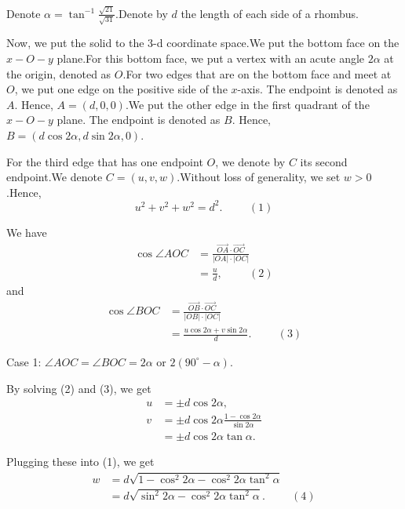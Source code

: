 \begin{enumerate}
{{Denote $\alpha = \tan^{-1} \frac{\sqrt{21}}{\sqrt{31}}$.Denote by $d$ the length of each side of a rhombus.

 Now, we put the solid to the 3-d coordinate space.We put the bottom face on the $x-O-y$ plane.For this bottom face, we put a vertex with an acute angle $2 \alpha$ at the origin, denoted as $O$.For two edges that are on the bottom face and meet at $O$, we put one edge on the positive side of the $x$-axis. The endpoint is denoted as $A$. Hence, $A = \left( d , 0 , 0 \right)$.We put the other edge in the first quadrant of the $x-O-y$ plane. The endpoint is denoted as $B$. Hence, $B = \left( d \cos 2 \alpha , d \sin 2 \alpha , 0 \right)$.

 For the third edge that has one endpoint $O$, we denote by $C$ its second endpoint.We denote $C = \left( u , v , w \right)$.Without loss of generality, we set $w > 0$.Hence,
 \[ u^2 + v^2 + w^2 = d^2 . \hspace{1cm} (1) \]

 We have
 \begin{align*} \cos \angle AOC & = \frac{\overrightarrow{OA} \cdot \overrightarrow{OC}}{|OA| \cdot |OC|} \\ & = \frac{u}{d} , \hspace{1cm} (2) \end{align*}
and
 \begin{align*} \cos \angle BOC & = \frac{\overrightarrow{OB} \cdot \overrightarrow{OC}}{|OB| \cdot |OC|} \\ & = \frac{u \cos 2 \alpha + v \sin 2 \alpha}{d} . \hspace{1cm} (3) \end{align*}


 Case 1: $\angle AOC = \angle BOC = 2 \alpha$ or $2 \left( 90^\circ - \alpha \right)$.

 By solving (2) and (3), we get
 \begin{align*} u & = \pm d \cos 2 \alpha , \\ v & = \pm d \cos 2 \alpha \frac{1 - \cos 2 \alpha}{\sin 2 \alpha} \\ & = \pm d \cos 2 \alpha \tan \alpha . \end{align*}


 Plugging these into (1), we get
 \begin{align*} w & = d \sqrt{1 - \cos^2 2 \alpha - \cos^2 2 \alpha \tan^2 \alpha} \\ & = d \sqrt{\sin^2 2 \alpha - \cos^2 2 \alpha \tan^2 \alpha} . \hspace{1cm} (4) \end{align*}


}}
\end{enumerate}
